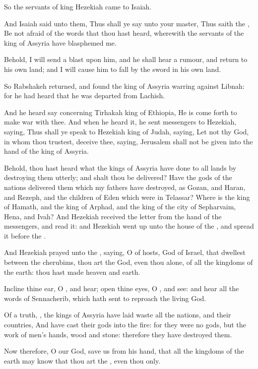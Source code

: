 \verse So the servants of king Hezekiah came to Isaiah.

\verse And Isaiah said unto them, Thus shall ye say unto your master, Thus saith the \LORD, Be not afraid of the words that thou hast heard, wherewith the servants of the king of Assyria have blasphemed me.

\verse Behold, I will send a blast upon him, and he shall hear a rumour, and return to his own land; and I will cause him to fall by the sword in his own land.

\verse So Rabshakeh returned, and found the king of Assyria warring against Libnah: for he had heard that he was departed from Lachish.

\verse And he heard say concerning Tirhakah king of Ethiopia, He is come forth to make war with thee. And when he heard it, he sent messengers to Hezekiah, saying, \verse Thus shall ye speak to Hezekiah king of Judah, saying, Let not thy God, in whom thou trustest, deceive thee, saying, Jerusalem shall not be given into the hand of the king of Assyria.

\verse Behold, thou hast heard what the kings of Assyria have done to all lands by destroying them utterly; and shalt thou be delivered?  \verse Have the gods of the nations delivered them which my fathers have destroyed, as Gozan, and Haran, and Rezeph, and the children of Eden which were in Telassar?  \verse Where is the king of Hamath, and the king of Arphad, and the king of the city of Sepharvaim, Hena, and Ivah?  \verse And Hezekiah received the letter from the hand of the messengers, and read it: and Hezekiah went up unto the house of the \LORD, and spread it before the \LORD.

\verse And Hezekiah prayed unto the \LORD, saying, \verse O \LORD of hosts, God of Israel, that dwellest between the cherubims, thou art the God, even thou alone, of all the kingdoms of the earth: thou hast made heaven and earth.

\verse Incline thine ear, O \LORD, and hear; open thine eyes, O \LORD, and see: and hear all the words of Sennacherib, which hath sent to reproach the living God.

\verse Of a truth, \LORD, the kings of Assyria have laid waste all the nations, and their countries, \verse And have cast their gods into the fire: for they were no gods, but the work of men's hands, wood and stone: therefore they have destroyed them.

\verse Now therefore, O \LORD our God, save us from his hand, that all the kingdoms of the earth may know that thou art the \LORD, even thou only.

